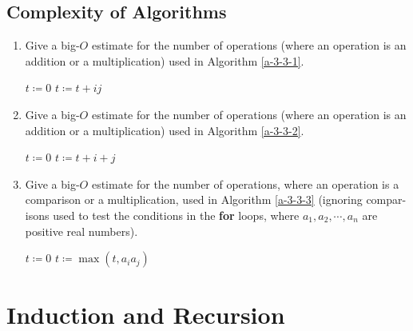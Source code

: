 \documentclass{../../cls/sig-alternate-05-2015}
\begin{document}
\subsection{Complexity of Algorithms}
\begin{enumerate}
\item Give a big-$O$ estimate for the number of operations (where an operation is an addition or a multiplication) used in Algorithm \ref{a-3-3-1}. \begin{algorithm}
	\caption{}
	\label{a-3-3-1}
	\begin{algorithmic}
		\STATE $t \coloneqq 0$
		\STATE $t \coloneqq t + ij$
		\ENDFOR
		\ENDFOR
	\end{algorithmic}
\end{algorithm}

\item Give a big-$O$ estimate for the number of operations (where an operation is an addition or a multiplication) used in Algorithm \ref{a-3-3-2}. \begin{algorithm}
	\caption{}
	\label{a-3-3-2}
	\begin{algorithmic}
		\STATE $t \coloneqq 0$
		\FOR{$i \coloneqq 1, 2, \cdots, n$}
		\FOR{$j \coloneqq 1, 2, \cdots, n$}
		\STATE $t \coloneqq t + i + j$
		\ENDFOR
		\ENDFOR
	\end{algorithmic}
\end{algorithm}

\item Give a big-$O$ estimate for the number of operations, where an operation is a comparison or a multiplication, used in Algorithm \ref{a-3-3-3} (ignoring compar- isons used to test the conditions in the \textbf{for} loops, where $a_1, a_2, \cdots, a_n$ are positive real numbers). \begin{algorithm}
	\caption{}
	\label{a-3-3-3}
	\begin{algorithmic}
		\STATE $t \coloneqq 0$
		\FOR{$j \coloneqq i + 1, i + 2, \cdots, n$}
		\STATE $t \coloneqq \max(t, a_i a_j)$
		\ENDFOR
		\ENDFOR
	\end{algorithmic}
\end{algorithm}

\end{enumerate}

\section{Induction and Recursion}
\end{document}
